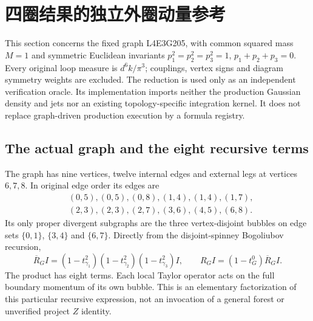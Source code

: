 \section{四圈结果的独立外圈动量参考}
\label{sec:four-loop-independent}

This section concerns the fixed graph L4E3G205, with common squared mass
$M=1$ and symmetric Euclidean invariants $p_1^2=p_2^2=p_3^2=1$,
$p_1+p_2+p_3=0$.  Every original loop measure is $d^6k/\pi^3$; couplings,
vertex signs and diagram symmetry weights are excluded.  The reduction is
used only as an independent verification oracle.  Its implementation imports
neither the production Gaussian density and jets nor an existing
topology-specific integration kernel.  It does not replace graph-driven
production execution by a formula registry.

\subsection{The actual graph and the eight recursive terms}

The graph has nine vertices, twelve internal edges and external legs at
vertices $6,7,8$.  In original edge order its edges are
\begin{equation}
\begin{split}
 &(0,5),(0,5),(0,8),(1,4),(1,4),(1,7),\\
 &(2,3),(2,3),(2,7),(3,6),(4,5),(6,8).
\end{split}
\end{equation}
Its only proper divergent subgraphs are the three vertex-disjoint bubbles
on edge sets $\{0,1\}$, $\{3,4\}$ and $\{6,7\}$.  Directly from the
disjoint-spinney Bogoliubov recursion,
\begin{equation}
 \overline R_G I=
 (1-t_{\gamma_1}^{2})(1-t_{\gamma_2}^{2})(1-t_{\gamma_3}^{2})I,
 \qquad R_G I=(1-t_G^0)\overline R_G I.
 \label{eq:four-independent-eight}
\end{equation}
The product has eight terms.  Each local Taylor operator acts on the full
boundary momentum of its own bubble.  This is an elementary factorization
of this particular recursive expression, not an invocation of a general
forest or unverified project $Z$ identity.

